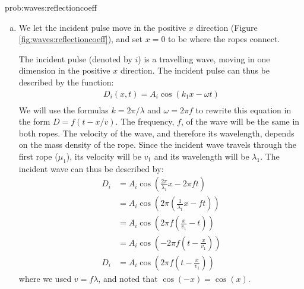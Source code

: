 \begin{solution}{prob:waves:reflectioncoeff}\label{soln:waves:reflectioncoeff}
\begin{enumerate}[(a)] 
\item We let the incident pulse move in the positive $x$ direction (Figure \ref{fig:waves:reflectioncoeff}), and set $x=0$ to be where the ropes connect.

The incident pulse (denoted by $i$) is a travelling wave, moving in one dimension in the positive $x$ direction. The incident pulse can thus be described by the function:
\begin{align*}
D_i(x,t)=A_i\cos(k_1x-\omega t)\\
\end{align*}
We will use the formulas $k=2\pi/\lambda$ and $\omega=2\pi f$ to rewrite this equation in the form $D=f(t- x/v)$. The frequency, $f$, of the wave will be the same in both ropes. The velocity of the wave, and therefore its wavelength, depends on the mass density of the rope. Since the incident wave travels through the first rope ($\mu_1$), its velocity will be $v_1$ and its wavelength will be $\lambda_1$. The incident wave can thus be described by:
\begin{align*}
D_i&=A_i\cos\left( \frac{2\pi}{\lambda_1}x-2\pi ft\right)\\
&=A_i\cos \left( 2\pi\left(\frac{1}{\lambda_1}x- ft\right)\right)\\
&=A_i\cos \left( 2\pi f\left(\frac{x}{v_1}- t\right)\right)\\
&=A_i\cos \left( -2\pi f\left(t-\frac{x}{v_1}\right)\right)\\
D_i&=A_i\cos \left(2\pi f\left(t-\frac{x}{v_1}\right)\right)
\end{align*}
where we used $v=f\lambda$, and noted that $\cos(-x)=\cos(x)$.\\


\end{enumerate}
\end{solution}
